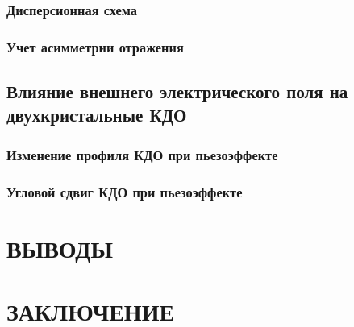 \documentclass[pdftex,a4paper,14pt,english,russian]{extarticle}
\makeatletter
\numberwithin{equation}{subsection}
\def\redeflsection{\def\l@section{\@dottedtocline{1}{1.5em}{7.8em}}}
\renewcommand\appendix{\par
\setcounter{section}{0}%
\setcounter{subsection}{0}%
\def\@chapapp{\appendixname}%
\addtocontents{toc}{\protect\redeflsection}
\def\thesection{\appendixname\hspace{0.2cm}\@arabic\c@section}}
\makeatother
\begin{document}
    \subsubsection{Дисперсионная схема}
    
    \subsubsection{Учет асимметрии отражения}
    
  \subsection{Влияние внешнего электрического поля на двухкристальные КДО}
    \subsubsection{Изменение профиля КДО при пьезоэффекте}
      
    \subsubsection{Угловой сдвиг КДО при пьезоэффекте}
      
    \newpage

    \section*{ \centering ВЫВОДЫ }

      
      \newpage

      \section*{ \centering ЗАКЛЮЧЕНИЕ }
      

\newpage
  \begin{center}
  
  \end{center}

\newpage
\appendix
  
  
  
\end{document}
